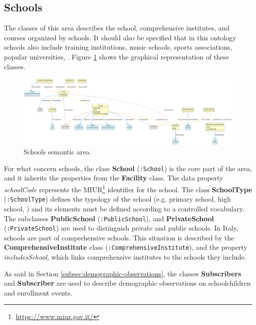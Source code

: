 \subsection{Schools}
\label{subsec:schools}

The classes of this area describes the school, comprehensive institutes, and courses organized by schools. It should also be specified that in this ontology schools also include training institutions, music schools, sports associations, popular universities, \etc. Figure \ref{fig:schools-sa} shows the graphical representation of these classes.

\begin{figure}
  \centering
  \includegraphics[width=\columnwidth]{images/ontoim/schools}
  \caption{Schools semantic area.}
  \label{fig:schools-sa}
\end{figure}

For what concern schools, the class \textbf{School} (\verb#:School#) is the core part of the area, and it inherits the properties from the \textbf{Facility} class. The data property \textit{schoolCode} represents the MIUR\footnote{\url{https://www.miur.gov.it/}} identifier for the school. The class \textbf{SchoolType} (\verb#:SchoolType#) defines the typology of the school (e.g. primary school, high school, \etc) and its elements must be defined according to a controlled vocabulary. The subclasses \textbf{PublicSchool} (\verb#:PublicSchool#), and \textbf{PrivateSchool} (\verb#:PrivateSchool#) are used to distinguish private and public schools. In Italy, schools are part of comprehensive schools. This situation is described by the \textbf{ComprehensiveInstitute} class (\verb#:ComprehensiveInstitute#), and the property \textit{includesSchool}, which links comprehensive institutes to the schools they include.

As said in Section \ref{subsec:demographic-observations}, the classes \textbf{Subscribers} and \textbf{Subscriber} are used to describe demographic observations on schoolchildren and enrollment events.

